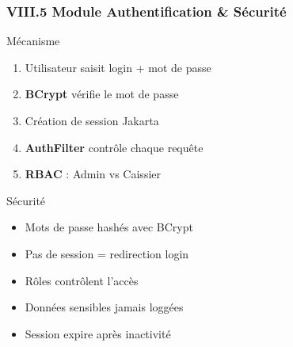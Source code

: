 \documentclass[11pt, aspectratio=169]{beamer}
\begin{document}
\begin{frame}
    \frametitle{VIII.5 Module Authentification \& Sécurité}
    
    \begin{block}{Mécanisme}
        \begin{enumerate}
            \item Utilisateur saisit login + mot de passe
            \item \textbf{BCrypt} vérifie le mot de passe
            \item Création de session Jakarta
            \item \textbf{AuthFilter} contrôle chaque requête
            \item \textbf{RBAC} : Admin vs Caissier
        \end{enumerate}
    \end{block}
    
    \vspace{0.8cm}
    
    \begin{block}{Sécurité}
        \begin{itemize}
            \item[\faLock] Mots de passe hashés avec BCrypt
            \item[\faShieldAlt] Pas de session = redirection login
            \item[\faUserLock] Rôles contrôlent l'accès
            \item[\faEyeSlash] Données sensibles jamais loggées
            \item[\faLockOpen] Session expire après inactivité
        \end{itemize}
    \end{block}
\end{frame}
\end{document}
